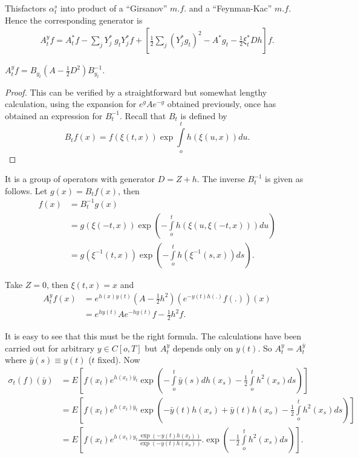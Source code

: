 This\pageoriginale factors $\alpha^s_t$ into product of a
``Girsanov'' $m.f$. and a 
``Feynman-Kac'' $m.f$. Hence the corresponding generator is 
\begin{align*}
A^y_t f  = A^*_t f  - \sum_j Y^*_j ~ g_t  Y^*_j f
 + \left[\frac{1}{2} \sum_j (Y^*_jg_t)^2 - A^* g_t -
   \frac{1}{2}\xi^*_t Dh\right] f.
\end{align*}

\begin{prop}%
  $A^y_t f = B_{y_t} \left(A - \frac{1}{2}D^2\right)B^{-1}_{y_t}$.
\end{prop}

\begin{proof}
  This can be verified by a straightforward but somewhat lengthy
  calculation, using the expansion for $e^gAe^{-g}$ obtained
  previously, once has obtained an expression for $B^{-1}_t$. Recall
  that $B_t$ is defined by  
  $$
  B_tf(x) = f(\xi(t,x)) \exp \int\limits^t_o h(\xi(u,x))du.
  $$
\end{proof}

It is a group of operators with generator $D = Z + h$. The inverse
$B^{-1}_t$ is given as follows. Let $g(x) = B_t f(x)$, then 
\begin{align*}
  f(x) & = B^{-1}_t g(x)\\
  & = g(\xi(-t,x)) \exp \left(-\int\limits^t_o h(\xi(u,\xi(-t,x)))du
  \right)\\ 
  & = g(\xi^{-1}(t,x)) \exp \left( -\int\limits^t_o
  h(\xi^{-1}(s,x))ds\right). 
\end{align*}

\begin{example}\pageoriginale
  Take  $ Z  = 0$, then $ \xi(t,x) = x$  and
\begin{align*}
  A^y_t f(x) & = e^{h(x)y(t)} \left(A
  -\frac{1}{2}h^2\right)(e^{-y(t)h(.)}f(.))(x)\\ 
  & = e^{hy(t)} A e^{-hy(t)} f - \frac{1}{2}h^2 f.
\end{align*}
\end{example}

It is easy to see that this must be the right formula. The
calculations have been carried out for arbitrary $y  \in  C[o,
  T]$ but $A^y_t$ depends only on $y(t)$. So $A^y_t = A^{\bar{y}}_t$
where $\bar{y}(s) \equiv y(t)$ ($t$ fixed). Now 
\begin{align*}
  \sigma_t(f)(\bar{y}) & = E\left[f(x_t)e^{h(x_t)\bar{y}_t} \exp
    \left(-\int\limits^t_o \bar{y}(s)dh(x_s) - \frac{1}{2}\int\limits^t_o
    h^2(x_s)ds\right)\right]\\ 
  & = E\left[f(x_t)e^{h(x_t)\bar{y}_t} \exp \left(-\bar{y}(t)h(x_s) +
    \bar{y}(t)h(x_o)- \frac{1}{2}\int\limits^t_o h^2 (x_s)ds\right)\right]\\ 
  & = E\left[f(x_t)e^{h(x_t)y_t}\frac{\exp \left(-y(t)h(x_t)\right)}{\exp
      (-y(t)h(x_o))}. \exp \left(-\frac{1}{2}\int\limits^t_o
    h^2(x_s)ds\right)\right].  
\end{align*}

